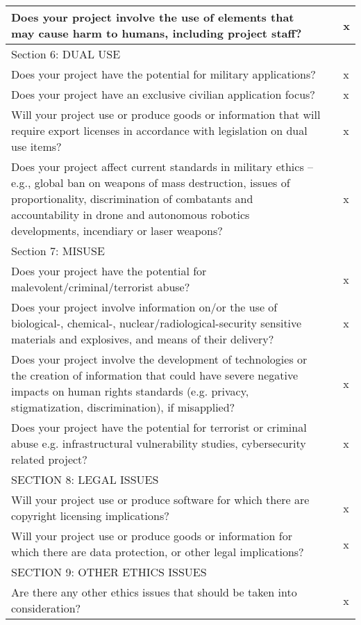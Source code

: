 \begin{center}
\begin{longtable}{ | m{30em} | m{1.5em} | m{1.5em} | }
    Does your project involve the use of elements that may cause harm to humans, including project staff? & & x  \\ \hline
    Section 6: DUAL USE &  & \  \\ \hline
    Does your project have the potential for military applications? & & x  \\ \hline
    Does your project have an exclusive civilian application focus? & & x  \\ \hline
    Will your project use or produce goods or information that will require export licenses in accordance with legislation on dual use items? & & x  \\ \hline
    Does your project affect current standards in military ethics – e.g., global ban on weapons of mass destruction, issues of proportionality, discrimination of combatants and accountability in drone and autonomous robotics developments, incendiary or laser weapons? & & x  \\ \hline
    \cellcolor[HTML]{C0C0C0} Section 7: MISUSE &  & \  \\ \hline
    Does your project have the potential for malevolent/criminal/terrorist abuse? & & x  \\ \hline
    Does your project involve information on/or the use of biological-, chemical-, nuclear/radiological-security sensitive materials and explosives, and means of their delivery? & & x  \\ \hline
    Does your project involve the development of technologies or the creation of information that could have severe negative impacts on human rights standards (e.g. privacy, stigmatization, discrimination), if misapplied? & & x  \\ \hline
    Does your project have the potential for terrorist or criminal abuse e.g. infrastructural vulnerability studies, cybersecurity related project? & & x  \\ \hline
    \cellcolor[HTML]{C0C0C0} SECTION 8: LEGAL ISSUES &  & \  \\ \hline
    Will your project use or produce software for which there are copyright licensing implications? & & x  \\ \hline
    Will your project use or produce goods or information for which there are data protection, or other legal implications? & & x  \\ \hline
    \cellcolor[HTML]{C0C0C0} SECTION 9: OTHER ETHICS ISSUES &  & \  \\ \hline
    Are there any other ethics issues that should be taken into consideration? & & x  \\ \hline
    \end{longtable}
\end{center}